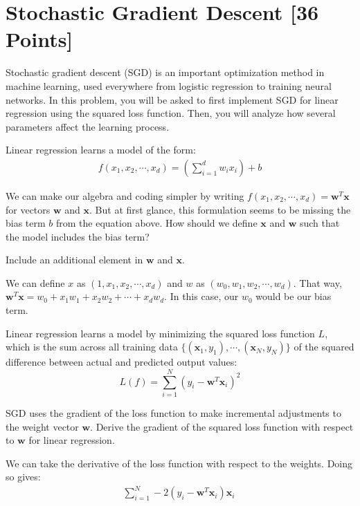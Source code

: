 \newpage
\section{Stochastic Gradient Descent [36 Points]}

Stochastic gradient descent (SGD) is an important optimization method in machine learning, used everywhere from logistic regression to training neural networks. In this problem, you will be asked to first implement SGD for linear regression using the squared loss function. Then, you will analyze how several parameters affect the learning process.

Linear regression learns a model of the form:
\begin{align*}
  f(x_1, x_2, \cdots, x_d) = \left(\sum_{i=1}^d w_i x_i\right) + b
\end{align*}

\begin{problem}[2]
  We can make our algebra and coding simpler by writing $f(x_1, x_2, \cdots, x_d) = \mathbf{w}^T\mathbf{x}$ for vectors $\mathbf{w}$ and $\mathbf{x}$.  But at first glance, this formulation seems to be missing the bias term $b$ from the equation above.  How should we define $\mathbf{x}$ and $\mathbf{w}$ such that the model includes the bias term?
\end{problem}
\begin{hint}
  Include an additional element in $\mathbf{w}$ and $\mathbf{x}$.
\end{hint}
\begin{solution}
  We can define $x$ as $(1, x_1, x_2, \cdots, x_d)$ and $w$ as $(w_0, w_1, w_2, \cdots, w_d)$. That way,  $\mathbf{w}^T\mathbf{x} = w_0+{x_1}{w_1}+{x_2}{w_2}+\cdots+{x_d}{w_d}$. In this case, our $w_0$ would be our bias term.
\end{solution}

Linear regression learns a model by minimizing the squared loss function $L$, which is the sum across all training data $\{(\mathbf{x}_1, y_1),\cdots,(\mathbf{x}_N, y_N)\}$ of the squared difference between actual and predicted output values:
\[L(f) = \sum_{i=1}^N (y_i - \mathbf{w}^T\mathbf{x}_i)^2\]

\begin{problem}[2]
  SGD uses the gradient of the loss function to make incremental adjustments to the weight vector $\mathbf{w}$. Derive the gradient of the squared loss function with respect to $\mathbf{w}$ for linear regression.
\end{problem}
\begin{solution}
  We can take the derivative of the loss function with respect to the weights. Doing so gives:
  \begin{align*}
      \sum_{i=1}^N -2(y_i - \mathbf{w}^T\mathbf{x}_i)\mathbf{x}_i\
  \end{align*}
\end{solution}

